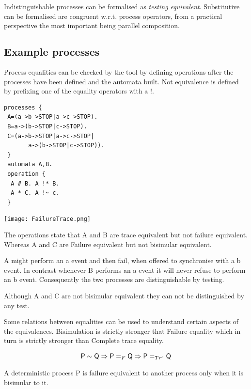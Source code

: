 \documentclass[]{article}
\begin{document}
Indistinguishable processes  can be formalised as \emph{testing equivalent}. Substitutive can be formalised are congruent w.r.t. process operators, from a practical perspective the most important being parallel composition.


 
 \subsection{Example processes}
 Process equalities can be checked by the tool by defining operations after the processes have been defined and the automata built. Not equivalence is defined by prefixing one of the equality operators with a {\sf !}.
 
\noindent\begin{minipage}{0.35\textwidth}
\begin{verbatim}
processes {
 A=(a->b->STOP|a->c->STOP).
 B=a->(b->STOP|c->STOP).
 C=(a->b->STOP|a->c->STOP| 
       a->(b->STOP|c->STOP)).
 }
 automata A,B.
 operation {
  A # B. A !* B.
  A * C. A !~ c.
 }
  \end{verbatim}
\end{minipage}
\begin{minipage}{0.6\textwidth}
\texttt{[image: FailureTrace.png]}
\end{minipage}
 
 The operations state that {\sf A} and {\sf B} are trace equivalent but not failure equivalent. Whereas {\sf A} and {\sf C} are Failure equivalent but not bisimular equivalent. 
 
 {\sf A} might perform an {\sf a} event and then fail, when offered to synchronise with a {\sf b} event.  In contrast whenever {\sf B} performs an {\sf a} event it will never refuse to perform an {\sf b} event. Consequently the two processes are distinguishable by testing.
 
 Although {\sf A} and {\sf C} are not bisimular equivalent they can not be distinguished by any test.
 
 
 Some relations between equalities  can be used to  understand certain aspects of the equivalences.
 Bisimulation is strictly stronger that Failure equality which in turn is strictly stronger than Complete trace equality.

 \[{\sf P}\sim {\sf Q} \Rightarrow {\sf P}=_F {\sf Q} \Rightarrow {\sf P}=_{Tr^c} {\sf Q} \]

\noindent  A deterministic process {\sf P} is failure equivalent to another process only when it is bisimular to it.
\end{document}
